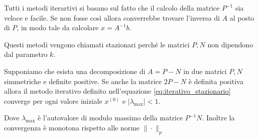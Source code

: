 Tutti i metodi iterartivi si basano sul fatto che il calcolo della matrice $P^{-1}$ 
sia veloce e facile. Se non fosse così allora converrebbe trovare l'inversa di 
$A$ al posto di $P$, in modo tale da calcolare $x=A^{-1}b$.

Questi metodi vengono chiamati stazionari perché le matrici $P,N$ non dipendono 
dal parametro $k$.

\begin{teorema}
    Supponiamo che esista una decomposizione di $A=P-N $ in due matrici $P, N$ simmetriche 
    e definite positive. Se anche la matrice $2P-N$ è definita positiva allora 
    il metodo iterativo definito nell'equazione \ref{eq:iterativo_stazionario} 
    converge per ogni valore iniziale $x^{(0)}$ e $|\lambda_{\max}| < 1$.

    Dove $\lambda_{\max}$ è l'autovalore di modulo massimo della matrice $P^{-1}N$.
    Inoltre la convergenza è monotona rispetto alle norme $\|\cdot\|_p$
\end{teorema}
